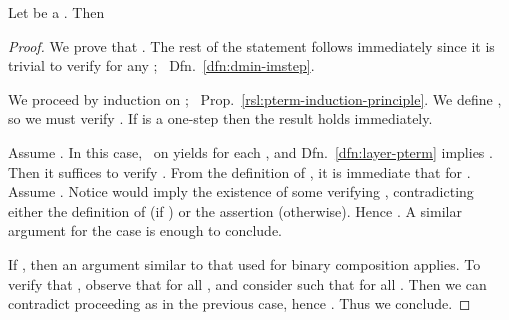 \begin{lemma}
\label{rsl:ppterm-seq-mind}
Let  be a \ppterm. 
Then \\ 
  \end{lemma}

\begin{proof}
We prove that .
The rest of the statement follows immediately since it is trivial to verify  for any ; \confer\ Dfn.~\ref{dfn:dmin-imstep}.

We proceed by induction on ; \confer\ Prop.~\ref{rsl:pterm-induction-principle}.
We define , so we must verify .
If  is a one-step then the result holds immediately.

Assume .
In this case, \ih\ on  yields  for each , and Dfn.~\ref{dfn:layer-pterm} implies .
Then it suffices to verify .
From the definition of , it is immediate that  for .
Assume . Notice  would imply the existence of some  verifying , contradicting either the definition of  (if ) or the assertion  (otherwise). Hence .
A similar argument for the case  is enough to conclude.

If , then an argument similar to that used for binary composition applies.
To verify that , observe that  for all , and consider  such that  for all .
Then we can contradict  proceeding as in the previous case, hence . Thus we conclude.
\end{proof}





